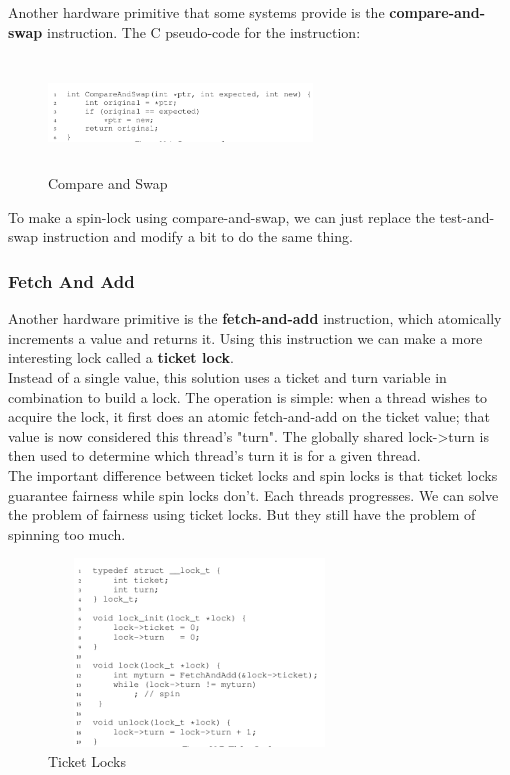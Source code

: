 Another hardware primitive that some systems provide is the \textbf{compare-and-
swap} instruction. The C pseudo-code for the instruction:

\begin{figure}[h!]
    \begin{center}
        \includegraphics[width=7cm, height=3cm]{img/284.png}
        \caption{Compare and Swap}
    \end{center}
\end{figure}

To make a spin-lock using compare-and-swap, we can just replace the test-and-swap
instruction and modify a bit to do the same thing.

\subsubsection{Fetch And Add}

Another hardware primitive is the \textbf{fetch-and-add} instruction, which
atomically increments a value and returns it. Using this instruction we can make
a more interesting lock called a \textbf{ticket lock}.\\

Instead of a single value, this solution uses a ticket and turn variable in
combination to build a lock. The operation is simple: when a thread wishes to
acquire the lock, it first does an atomic fetch-and-add on the ticket value;
that value is now considered this thread's "turn". The globally shared lock->turn
is then used to determine which thread's turn it is for a given thread. \\

The important difference between ticket locks and spin locks is that ticket
locks guarantee fairness while spin locks don't. Each threads progresses. We
can solve the problem of fairness using ticket locks. But they still have
the problem of spinning too much.

\begin{figure}[h!]
    \begin{center}
        \includegraphics[width=8cm, height=5cm]{img/287.png}
        \caption{Ticket Locks}
    \end{center}
\end{figure}


